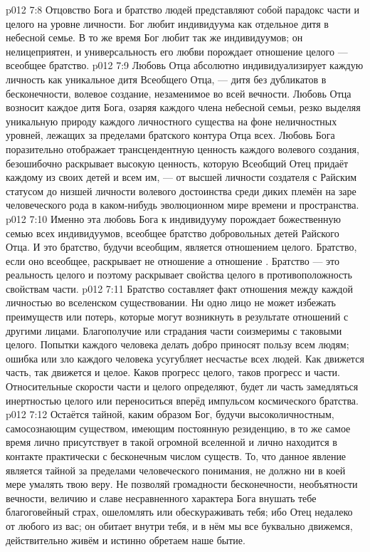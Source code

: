 \vs p012 7:8 Отцовство Бога и братство людей представляют собой парадокс части и целого на уровне личности. Бог любит  индивидуума как отдельное дитя в небесной семье. В то же время Бог любит так же  индивидуумов; он нелицеприятен, и универсальность его любви порождает отношение целого --- всеобщее братство.
\vs p012 7:9 Любовь Отца абсолютно индивидуализирует каждую личность как уникальное дитя Всеобщего Отца, --- дитя без дубликатов в бесконечности, волевое создание, незаменимое во всей вечности. Любовь Отца возносит каждое дитя Бога, озаряя каждого члена небесной семьи, резко выделяя уникальную природу каждого личностного существа на фоне неличностных уровней, лежащих за пределами братского контура Отца всех. Любовь Бога поразительно отображает трансцендентную ценность каждого волевого создания, безошибочно раскрывает высокую ценность, которую Всеобщий Отец придаёт каждому из своих детей и всем им, --- от высшей личности создателя с Райским статусом до низшей личности волевого достоинства среди диких племён на заре человеческого рода в каком\hyp{}нибудь эволюционном мире времени и пространства.
\vs p012 7:10 Именно эта любовь Бога к индивидууму порождает божественную семью всех индивидуумов, всеобщее братство добровольных детей Райского Отца. И это братство, будучи всеобщим, является отношением целого. Братство, если оно всеобщее, раскрывает не отношение  а отношение . Братство --- это реальность целого и поэтому раскрывает свойства целого в противоположность свойствам части.
\vs p012 7:11 Братство составляет факт отношения между каждой личностью во вселенском существовании. Ни одно лицо не может избежать преимуществ или потерь, которые могут возникнуть в результате отношений с другими лицами. Благополучие или страдания части соизмеримы с таковыми целого. Попытки каждого человека делать добро приносят пользу всем людям; ошибка или зло каждого человека усугубляет несчастье всех людей. Как движется часть, так движется и целое. Каков прогресс целого, таков прогресс и части. Относительные скорости части и целого определяют, будет ли часть замедляться инертностью целого или переноситься вперёд импульсом космического братства.
\vs p012 7:12 \pc Остаётся тайной, каким образом Бог, будучи высоколичностным, самосознающим существом, имеющим постоянную резиденцию, в то же самое время лично присутствует в такой огромной вселенной и лично находится в контакте практически с бесконечным числом существ. То, что данное явление является тайной за пределами человеческого понимания, не должно ни в коей мере умалять твою веру. Не позволяй громадности бесконечности, необъятности вечности, величию и славе несравненного характера Бога внушать тебе благоговейный страх, ошеломлять или обескураживать тебя; ибо Отец недалеко от любого из вас; он обитает внутри тебя, и в нём мы все буквально движемся, действительно живём и истинно обретаем наше бытие.
